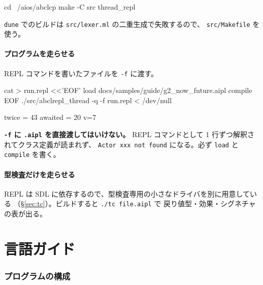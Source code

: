 \documentclass[11pt,a4paper]{ltjsarticle}
\begin{document}
\begin{term}
cd ~/aios/abclcp
make -C src thread_repl
\end{term}

\texttt{dune} でのビルドは \texttt{src/lexer.ml} の二重生成で失敗するので、
\texttt{src/Makefile} を使う。

\subsection{プログラムを走らせる}

REPL コマンドを書いたファイルを \texttt{-f} に渡す。

\begin{term}
cat > run.repl <<'EOF'
load docs/samples/guide/g2_now_future.aipl
compile
EOF
./src/abclrepl_thread -q -f run.repl < /dev/null
\end{term}

\begin{term}
twice = 43
awaited = 20
v=7
\end{term}

\textbf{\texttt{-f} に \texttt{.aipl} を直接渡してはいけない。}
REPL コマンドとして 1 行ずつ解釈されてクラス定義が読まれず、
\texttt{Actor xxx not found} になる。必ず \texttt{load} と \texttt{compile} を書く。

\subsection{型検査だけを走らせる}

REPL は SDL に依存するので、型検査専用の小さなドライバを別に用意している
（\S\ref{sec:tc}）。ビルドすると \texttt{./tc file.aipl} で
戻り値型・効果・シグネチャの表が出る。


\part{言語ガイド}
\label{part:lang}

\section{プログラムの構成}
\end{document}
